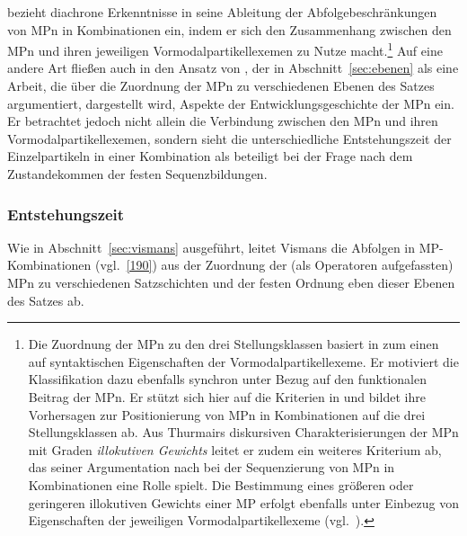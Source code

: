 \noindent
\citet{Abraham1995} bezieht diachrone  Erkenntnisse in seine Ableitung der Abfolgebeschränkungen von MPn in Kombinationen ein, indem er sich den Zusammenhang zwischen den MPn und ihren jeweiligen Vormodalpartikellexemen  zu Nutze macht.\footnote{Die Zuordnung der MPn zu den drei Stellungsklassen basiert in \citet{Abraham1995} zum einen auf syntaktischen Eigenschaften der Vormodalpartikellexeme. Er motiviert die Klassifikation dazu ebenfalls synchron unter Bezug auf den funktionalen Beitrag der MPn. Er stützt sich hier auf die Kriterien in \citet{Thurmair1989, Thurmair1991} und bildet ihre Vorhersagen zur Positionierung von MPn in Kombinationen auf die drei Stellungsklassen ab. Aus Thurmairs diskursiven Charakterisierungen der MPn mit Graden \textit{illokutiven Gewichts} leitet er zudem ein weiteres Kriterium ab, das seiner Argumentation nach bei der Sequenzierung von MPn in Kombinationen eine Rolle spielt. Die Bestimmung eines größeren oder geringeren illokutiven Gewichts einer MP erfolgt ebenfalls unter Einbezug von Eigenschaften der jeweiligen Vormodalpartikellexeme  (vgl.\ \citealt[104]{Abraham1995}).} Auf eine andere Art fließen auch in den Ansatz von \citet{Vismans1994}, der in Abschnitt~\ref{sec:ebenen} als eine Arbeit, die über die Zuordnung der MPn zu verschiedenen Ebenen des Satzes argumentiert, dargestellt wird, Aspekte der Ent\-wicklungsgeschichte der MPn ein. Er betrachtet jedoch nicht allein die Verbin\-dung zwischen den MPn und ihren Vormodalpartikellexemen, sondern sieht die unterschiedliche Entstehungszeit der Einzelpartikeln in einer Kombination als beteiligt bei der Frage nach dem Zustandekommen der festen Sequenzbildungen.

\subsubsection{Entstehungszeit}
Wie in Abschnitt~\ref{sec:vismans} ausgeführt, leitet Vismans die Abfolgen in MP-Kom\-bi\-na\-tion\-en (vgl.\ \ref{190}) aus der Zuordnung der (als Operatoren  aufgefassten) MPn zu verschiedenen Satzschichten und der festen Ordnung eben dieser Ebenen des Satzes ab.

